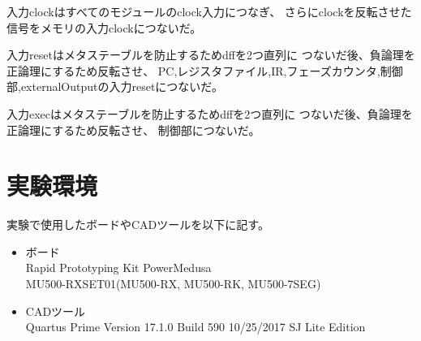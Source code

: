 \documentclass[a4j,titlepage]{jarticle}
\begin{document}
入力clockはすべてのモジュールのclock入力につなぎ、
さらにclockを反転させた信号をメモリの入力clockにつないだ。

入力resetはメタステーブルを防止するためdffを2つ直列に
つないだ後、負論理を正論理にするため反転させ、
PC,レジスタファイル,IR,フェーズカウンタ,制御部,externalOutputの入力resetにつないだ。

入力execはメタステーブルを防止するためdffを2つ直列に
つないだ後、負論理を正論理にするため反転させ、
制御部につないだ。
\section{実験環境}
実験で使用したボードやCADツールを以下に記す。

\begin{itemize}
\item ボード \\Rapid Prototyping Kit PowerMedusa \\ MU500-RXSET01(MU500-RX, MU500-RK, MU500-7SEG) %
\item CADツール \\ Quartus Prime Version 17.1.0 Build 590 10/25/2017 SJ Lite Edition
\end{itemize}
\end{document}
